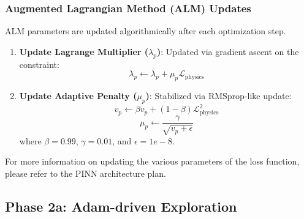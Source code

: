 \documentclass{article}
\begin{document}

\subsubsection*{Augmented Lagrangian Method (ALM) Updates}
ALM parameters are updated algorithmically after each optimization step.
\begin{enumerate}
    \item \textbf{Update Lagrange Multiplier ($\lambda_p$)}: Updated via gradient ascent on the constraint:
    \begin{equation}
    \lambda_{p} \leftarrow \lambda_{p} + \mu_{p}\mathcal{L}_{\text{physics}}
    \end{equation}
    \item \textbf{Update Adaptive Penalty ($\mu_p$)}: Stabilized via RMSprop-like update:
    \begin{equation}
    v_{p} \leftarrow \beta v_{p} + (1-\beta)\mathcal{L}_{\text{physics}}^{2}
    \end{equation}
    \begin{equation}
    \mu_{p} \leftarrow \frac{\gamma}{\sqrt{v_{p}+\epsilon}}
    \end{equation}
    where $\beta=0.99$, $\gamma=0.01$, and $\epsilon=1e-8$.
\end{enumerate}

For more information on updating the various parameters of the loss function, please refer to the PINN architecture plan.

\subsection{Phase 2a: Adam-driven Exploration}
\end{document}
